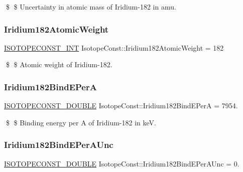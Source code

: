 \$ \$ Uncertainty in atomic mass of Iridium-\/182 in amu. \mbox{\label{group___isotope_const-_iridium-_ir182_ga831ca03cf5ecca7d496893c365608e22}} 
\subsubsection{\texorpdfstring{Iridium182\+Atomic\+Weight}{Iridium182AtomicWeight}}
{\footnotesize\ttfamily \mbox{\hyperlink{group___isotope_const-_macros_ga5f18360b3e99483a35c32d789e62621c}{I\+S\+O\+T\+O\+P\+E\+C\+O\+N\+S\+T\+\_\+\+I\+NT}} Isotope\+Const\+::\+Iridium182\+Atomic\+Weight = 182}

\$ \$ Atomic weight of Iridium-\/182. \mbox{\label{group___isotope_const-_iridium-_ir182_gadf2261191292611ed423a872e83d8495}} 
\subsubsection{\texorpdfstring{Iridium182\+Bind\+E\+PerA}{Iridium182BindEPerA}}
{\footnotesize\ttfamily \mbox{\hyperlink{group___isotope_const-_macros_ga8f45a7272ce02c0b4c65c44636ed719a}{I\+S\+O\+T\+O\+P\+E\+C\+O\+N\+S\+T\+\_\+\+D\+O\+U\+B\+LE}} Isotope\+Const\+::\+Iridium182\+Bind\+E\+PerA = 7954.}

\$ \$ Binding energy per A of Iridium-\/182 in keV. \mbox{\label{group___isotope_const-_iridium-_ir182_gadce3cdb501b2f57b4520748d60bd4f76}} 
\subsubsection{\texorpdfstring{Iridium182\+Bind\+E\+Per\+A\+Unc}{Iridium182BindEPerAUnc}}
{\footnotesize\ttfamily \mbox{\hyperlink{group___isotope_const-_macros_ga8f45a7272ce02c0b4c65c44636ed719a}{I\+S\+O\+T\+O\+P\+E\+C\+O\+N\+S\+T\+\_\+\+D\+O\+U\+B\+LE}} Isotope\+Const\+::\+Iridium182\+Bind\+E\+Per\+A\+Unc = 0.}

